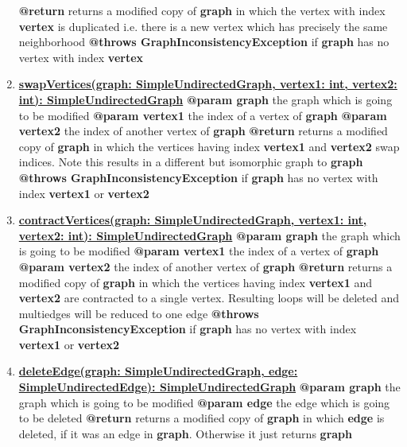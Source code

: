 \documentclass{article}
\begin{document}
\begin{enumerate}[+]
{			\textbf{@return} returns a modified copy of \textbf{graph} in which the vertex with index \textbf{vertex} is duplicated i.e. there is a new vertex which has precisely the same neighborhood \newline
			\textbf{@throws GraphInconsistencyException} if \textbf{graph} has no vertex with index \textbf{vertex} 
		}
		\item{
			\textbf{\underline{swapVertices(graph: SimpleUndirectedGraph, vertex1: int, vertex2: int): SimpleUndirectedGraph}} \newline
			\textbf{@param graph} the graph which is going to be modified \newline
			\textbf{@param vertex1} the index of a vertex of \textbf{graph} \newline
			\textbf{@param vertex2} the index of another vertex of \textbf{graph} \newline
			\textbf{@return} returns a modified copy of \textbf{graph} in which the vertices having index \textbf{vertex1} and \textbf{vertex2} swap indices. Note this results in a different but isomorphic graph to \textbf{graph}  \newline
			\textbf{@throws GraphInconsistencyException} if \textbf{graph} has no vertex with index \textbf{vertex1} or \textbf{vertex2} 
		}
		\item{
			\textbf{\underline{contractVertices(graph: SimpleUndirectedGraph, vertex1: int, vertex2: int): SimpleUndirectedGraph}} \newline
			\textbf{@param graph} the graph which is going to be modified \newline
			\textbf{@param vertex1} the index of a vertex of \textbf{graph} \newline
			\textbf{@param vertex2} the index of another vertex of \textbf{graph} \newline
			\textbf{@return} returns a modified copy of \textbf{graph} in which the vertices having index \textbf{vertex1} and \textbf{vertex2} are contracted to a single vertex. Resulting loops will be deleted and multiedges will be reduced to one edge \newline
			\textbf{@throws GraphInconsistencyException} if \textbf{graph} has no vertex with index \textbf{vertex1} or \textbf{vertex2} 
		}
		\item{
			\textbf{\underline{deleteEdge(graph: SimpleUndirectedGraph, edge: SimpleUndirectedEdge): SimpleUndirectedGraph}} \newline
			\textbf{@param graph} the graph which is going to be modified \newline
			\textbf{@param edge} the edge which is going to be deleted \newline
			\textbf{@return} returns a modified copy of \textbf{graph} in which \textbf{edge} is deleted, if it was an edge in \textbf{graph}. Otherwise it just returns \textbf{graph}
		}
		

\end{enumerate}
\end{document}
